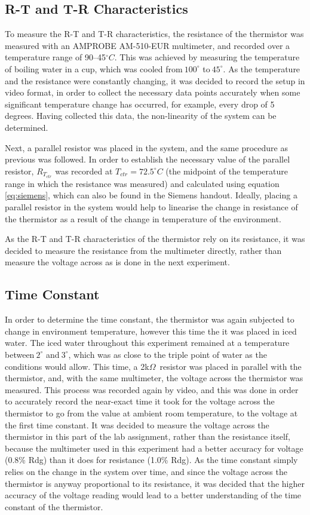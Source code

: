 \documentclass[a4,11pt]{article}
\begin{document}
\subsection{R-T and T-R Characteristics}
To measure the R-T and T-R characteristics, the resistance of the thermistor was measured with an AMPROBE AM-510-EUR multimeter, and recorded over a temperature range of 90--45$^{\circ}C$. This was achieved by measuring the temperature of boiling water in a cup, which was cooled from$~100^{\circ}$ to$~45^{\circ}$. As the temperature and the resistance were constantly changing, it was decided to record the setup in video format, in order to collect the necessary data points accurately when some significant temperature change has occurred, for example, every drop of 5 degrees. Having collected this data, the non-linearity of the system can be determined.

Next, a parallel resistor was placed in the system, and the same procedure as previous was followed. In order to establish the necessary value of the parallel resistor, $R_{T_{ctr}}$ was recorded at $T_{ctr}=72.5^{\circ}C$ (the midpoint of the temperature range in which the resistance was measured) and calculated using equation \ref{eq:siemens}, which can also be found in the Siemens handout. Ideally, placing a parallel resistor in the system would help to linearise the change in resistance of the thermistor as a result of the change in temperature of the environment.

As the R-T and T-R characteristics of the thermistor rely on its resistance, it was decided to measure the resistance from the multimeter directly, rather than measure the voltage across as is done in the next experiment.
\subsection{Time Constant}
In order to determine the time constant, the thermistor was again subjected to change in environment temperature, however this time the it was placed in iced water. The iced water throughout this experiment remained at a temperature between$~2^{\circ}$ and$~3^{\circ}$, which was as close to the triple point of water as the conditions would allow. This time, a 2k$\Omega$\ resistor was placed in parallel with the thermistor, and, with the same multimeter, the voltage across the thermistor was measured. This process was recorded again by video, and this was done in order to accurately record the near-exact time it took for the voltage across the thermistor to go from the value at ambient room temperature, to the voltage at the first time constant. It was decided to measure the voltage across the thermistor in this part of the lab assignment, rather than the resistance itself, because the multimeter used in this experiment had a better accuracy for voltage (0.8\% Rdg) than it does for resistance (1.0\% Rdg). As the time constant simply relies on the change in the system over time, and since the voltage across the thermistor is anyway proportional to its resistance, it was decided that the higher accuracy of the voltage reading would lead to a better understanding of the time constant of the thermistor.
\end{document}
